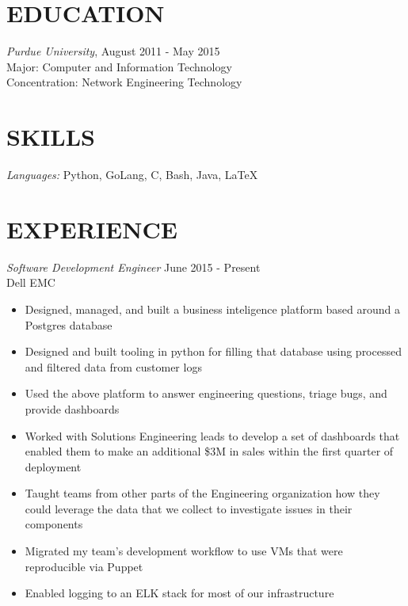 \documentclass[line,margin]{res}
\begin{document}
  \name{\textcolor{TealBlue}{Ethan Madden}}
  \address{ethan@madden.ninja}
  \address{(812) 250-1419}

\begin{resume}
  \section{\textcolor{TealBlue}{EDUCATION}} 
    {\sl Purdue University}, \hfill August 2011 - May 2015 \\
      Major: Computer and Information Technology \\
      Concentration: Network Engineering Technology

  \section{\textcolor{TealBlue}{SKILLS}} 
    {\sl Languages:}  Python, GoLang, C, Bash, Java, \LaTeX \\

  \section{\textcolor{TealBlue}{EXPERIENCE}} 
    {\sl Software Development Engineer} \hfill June 2015 - Present \\
      Dell EMC
      \begin{itemize}  \itemsep -2pt
          \item Designed, managed, and built a business inteligence platform based around a Postgres database
          \item Designed and built tooling in python for filling that database using processed and filtered data from customer logs
          \item Used the above platform to answer engineering questions, triage bugs, and provide dashboards
          \item Worked with Solutions Engineering leads to develop a set of dashboards that enabled them to make an additional \$3M in sales within the first quarter of deployment
          \item Taught teams from other parts of the Engineering organization how they could leverage the data that we collect to investigate issues in their components
          \item Migrated my team's development workflow to use VMs that were reproducible via Puppet
          \item Enabled logging to an ELK stack for most of our infrastructure
      \end{itemize}


\end{resume}
\end{document}
